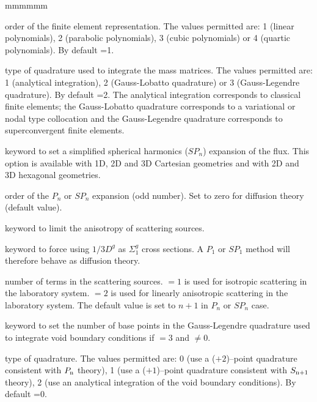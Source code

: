 \begin{ListeDeDescription}{mmmmmm}
\item[\dusa{ielem}] order of the finite element representation.  The values
permitted are: 1 (linear polynomials), 2 (parabolic polynomials), 3 (cubic
polynomials) or 4 (quartic polynomials). By default =1.

\item[\dusa{icol}] type of quadrature used to  integrate the mass matrices.
The values permitted are: 1 (analytical integration), 2  (Gauss-Lobatto
quadrature) or 3 (Gauss-Legendre quadrature). By default =2. The
analytical integration corresponds to classical finite elements; the
Gauss-Lobatto quadrature corresponds to a variational or nodal type
collocation and the Gauss-Legendre quadrature corresponds to superconvergent
finite elements.

\item[\moc{SPN}] keyword to set a simplified spherical harmonics ($SP_n$) expansion
of the flux.\cite{nse2005,ane10a} This option is available with 1D, 2D and 3D Cartesian geometries and with 2D and 3D
hexagonal geometries.

\item[\dusa{n}] order of the $P_n$ or $SP_n$ expansion (odd number). Set to zero for diffusion theory (default value).

\item[\moc{SCAT}] keyword to limit the anisotropy of scattering sources.

\item[\moc{DIFF}] keyword to force using $1/3D^{g}$ as $\Sigma_1^{g}$ cross sections. A $P_1$ or $SP_1$ method
will therefore behave as diffusion theory.

\item[\dusa{iscat}] number of terms in the scattering sources.  $=1$ is used for
isotropic scattering in the laboratory system.  $=2$ is used for
linearly anisotropic scattering in the laboratory system. The default value is set to $n+1$
in $P_n$ or $SP_n$ case.

\item[\moc{VOID}] keyword to set the number of base points in the Gauss-Legendre quadrature used to integrate
void boundary conditions if  $=3$ and  $\ne 0$.

\item[\dusa{nvd}] type of quadrature. The values
permitted are: 0 (use a ($+2$)--point quadrature consistent with $P_{\rm n}$ theory),
1 (use a ($+1$)--point quadrature consistent with $S_{{\rm n}+1}$ theory),
2 (use an analytical integration of the void boundary conditions). By default =0.


\end{ListeDeDescription}
